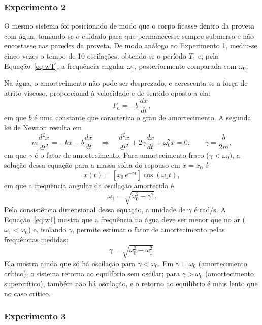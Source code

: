 \subsubsection{Experimento 2}

O mesmo sistema foi posicionado de modo que o corpo ficasse dentro da proveta com água, tomando-se o cuidado para que permanecesse sempre submerso e não encostasse nas paredes da proveta. De modo análogo ao Experimento 1, mediu-se cinco vezes o tempo de 10 oscilações, obtendo-se o período $T_1$ e, pela Equação~\eqref{eq:wT}, a frequência angular $\omega_1$, posteriormente comparada com $\omega_0$.

Na água, o amortecimento não pode ser desprezado, e acrescenta-se a força de atrito viscoso, proporcional à velocidade e de sentido oposto a ela:
\[
F_a=-b\,\frac{dx}{dt},
\]
em que $b$ é uma constante que caracteriza o grau de amortecimento. A segunda lei de Newton resulta em
\[
m\frac{d^2x}{dt^2}=-kx-b\frac{dx}{dt}
\quad\Longrightarrow\quad
\frac{d^2x}{dt^2}+2\gamma\frac{dx}{dt}+\omega_0^2x=0,
\qquad
\gamma=\frac{b}{2m},
\]
em que $\gamma$ é o fator de amortecimento. Para amortecimento fraco ($\gamma<\omega_0$), a solução dessa equação para a massa solta do repouso em $x=x_0$ é
\begin{equation}
x(t)=\left[x_0\,e^{-\gamma t}\right]\cos(\omega_1 t),
\label{eq:xamort}
\end{equation}
em que a frequência angular da oscilação amortecida é
\begin{equation}
\omega_1=\sqrt{\omega_0^2-\gamma^2}.
\label{eq:w1}
\end{equation}
Pela consistência dimensional dessa equação, a unidade de $\gamma$ é rad/s. A Equação~\eqref{eq:w1} mostra que a frequência na água deve ser menor que no ar ($\omega_1<\omega_0$) e, isolando $\gamma$, permite estimar o fator de amortecimento pelas frequências medidas:
\begin{equation}
\gamma=\sqrt{\omega_0^2-\omega_1^2}.
\label{eq:gw}
\end{equation}
Ela mostra ainda que só há oscilação para $\gamma<\omega_0$. Em $\gamma=\omega_0$ (amortecimento crítico), o sistema retorna ao equilíbrio sem oscilar; para $\gamma>\omega_0$ (amortecimento supercrítico), também não há oscilação, e o retorno ao equilíbrio é mais lento que no caso crítico.

\subsubsection{Experimento 3}

